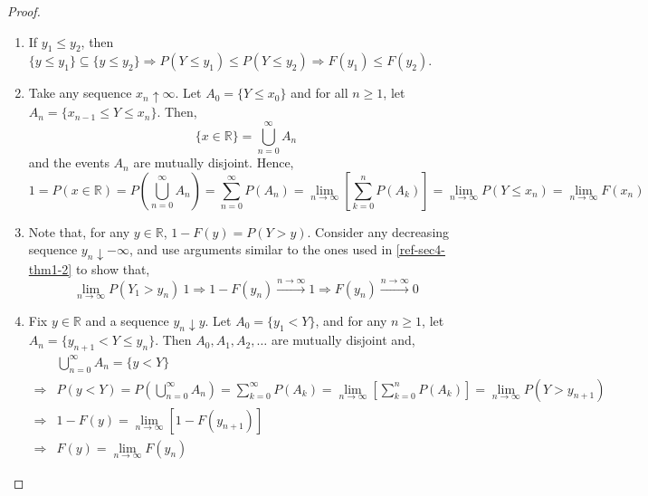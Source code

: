 \begin{proof} \quad                                                          \\
\begin{enumerate}[noitemsep, topsep=0em]
\item
    If $y_1 \leq y_2$, then $\lbrace y \leq y_1 \rbrace \subseteq \lbrace y
\leq y_2 \rbrace \Rightarrow P(Y \leq y_1) \leq P(Y \leq y_2) \Rightarrow
F(y_1) \leq F(y_2)$.
\item
    Take any sequence $x_n \uparrow \infty$. Let $A_0 = \lbrace Y \leq x_0
\rbrace$ and for all $n \geq 1$, let $A_n = \lbrace x_{n - 1} \leq Y \leq x_n
\rbrace$. Then,
\[
    \lbrace x \in \mathbb{R} \rbrace = \bigcup_{n = 0}^\infty A_n
\]
and the events $A_n$ are mutually disjoint. Hence,
\[
    1 = P(x \in \mathbb{R})
      = P(\bigcup_{n = 0}^\infty A_n)
      = \sum_{n = 0}^\infty P(A_n)
      = \lim_{n \rightarrow \infty} \left[ \sum_{k = 0}^n P(A_k) \right]
      = \lim_{n \rightarrow \infty} P(Y \leq x_n)
      = \lim_{n \rightarrow \infty} F(x_n)
\]
\item
    Note that, for any $y \in \mathbb{R}$, $1 - F(y) = P(Y > y)$. Consider any
decreasing sequence $y_n \downarrow -\infty$, and use arguments similar to the
ones used in \ref{ref-sec4-thm1-2} to show that, 
\[
                \lim_{n \rightarrow \infty} P(Y_1 > y_n) \ 1
    \Rightarrow 1 - F(y_n) \xrightarrow{n \rightarrow \infty} 1
    \Rightarrow F(y_n) \xrightarrow{n \rightarrow \infty} 0
\]
\item
    Fix $y \in \mathbb{R}$ and a sequence $y_n \downarrow y$. Let $A_0 =
\lbrace y_1 < Y \rbrace$, and for any $n \geq 1$, let $A_n = \lbrace y_{n + 1}
< Y \leq y_n \rbrace$. Then $A_0, A_1, A_2, \dots$ are mutually disjoint and,
\begin{align*}
    &\bigcup_{n = 0}^\infty A_n = \lbrace y < Y \rbrace                      \\
    \Rightarrow &
    P(y < Y) = P(\bigcup_{n = 0}^\infty A_n)
             = \sum_{k = 0}^\infty P(A_k)
             = \lim_{n \rightarrow \infty} \left[ \sum_{k = 0}^n P(A_k) \right]
             = \lim_{n \rightarrow \infty} P(Y > y_{n + 1})                  \\
    \Rightarrow &
    1 - F(y) = \lim_{n \rightarrow \infty} [1 - F(y_{n + 1})]                \\
    \Rightarrow &
    F(y) = \lim_{n \rightarrow \infty} F(y_n)
\end{align*}
\end{enumerate}
\end{proof}

